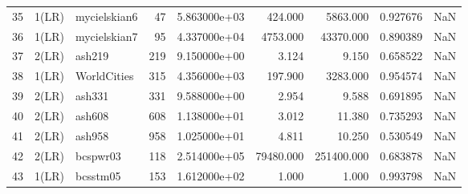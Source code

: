 \begin{tabular}{lllrrrrrr}
35 &  1(LR) &   mycielskian6 &    47 &  5.863000e+03 &      424.000 &     5863.000 &  0.927676 &   NaN \\
36 &  1(LR) &   mycielskian7 &    95 &  4.337000e+04 &     4753.000 &    43370.000 &  0.890389 &   NaN \\
37 &  2(LR) &         ash219 &   219 &  9.150000e+00 &        3.124 &        9.150 &  0.658522 &   NaN \\
38 &  1(LR) &    WorldCities &   315 &  4.356000e+03 &      197.900 &     3283.000 &  0.954574 &   NaN \\
39 &  2(LR) &         ash331 &   331 &  9.588000e+00 &        2.954 &        9.588 &  0.691895 &   NaN \\
40 &  2(LR) &         ash608 &   608 &  1.138000e+01 &        3.012 &       11.380 &  0.735293 &   NaN \\
41 &  2(LR) &         ash958 &   958 &  1.025000e+01 &        4.811 &       10.250 &  0.530549 &   NaN \\
42 &  2(LR) &       bcspwr03 &   118 &  2.514000e+05 &    79480.000 &   251400.000 &  0.683878 &   NaN \\
43 &  1(LR) &       bcsstm05 &   153 &  1.612000e+02 &        1.000 &        1.000 &  0.993798 &   NaN \\
\bottomrule
\end{tabular}
